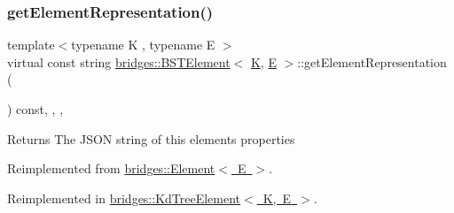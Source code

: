 \mbox{\label{classbridges_1_1_b_s_t_element_a623d1495a0d27090dc3fc515d148f381}} 
\subsubsection{\texorpdfstring{getElementRepresentation()}{getElementRepresentation()}}
{\footnotesize\ttfamily template$<$typename K , typename E $>$ \\
virtual const string \mbox{\hyperlink{classbridges_1_1_b_s_t_element}{bridges\+::\+B\+S\+T\+Element}}$<$ \mbox{\hyperlink{namespacebridges_acfb0a4f7877d8f63de3e6862004c50edaa5f3c6a11b03839d46af9fb43c97c188}{K}}, \mbox{\hyperlink{namespacebridges_acfb0a4f7877d8f63de3e6862004c50eda3a3ea00cfc35332cedf6e5e9a32e94da}{E}} $>$\+::get\+Element\+Representation (\begin{DoxyParamCaption}{ }\end{DoxyParamCaption}) const\hspace{0.3cm}{\ttfamily [inline]}, {\ttfamily [override]}, {\ttfamily [protected]}, {\ttfamily [virtual]}}

\begin{DoxyReturn}{Returns}
The J\+S\+ON string of this element\textquotesingle{}s properties 
\end{DoxyReturn}


Reimplemented from \mbox{\hyperlink{classbridges_1_1_element_abfea1b7226b774be648e15f6b2c9daba}{bridges\+::\+Element$<$ E $>$}}.



Reimplemented in \mbox{\hyperlink{classbridges_1_1_kd_tree_element_ad8aa2d89689f33691063fee9c601e2cb}{bridges\+::\+Kd\+Tree\+Element$<$ K, E $>$}}.

\mbox{\label{classbridges_1_1_b_s_t_element_ae758ef6696535dadf44eb302b923dbfd}} 
